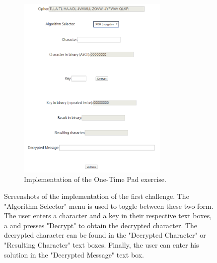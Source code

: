 \documentclass{l4proj}
\begin{document}
\begin{figure}[H]
    \begin{subfigure}[b]{0.65\textwidth}
        \centering
        \includegraphics[width=0.8\textwidth, frame]{images/xORImplementation.PNG}
        \caption{Implementation of the One-Time Pad exercise.}
        \label{fig:xORImp}
    \end{subfigure}
    \caption{Screenshots of the implementation of the first challenge.
    The "Algorithm Selector" menu is used to toggle between these two form.
    The user enters a character and a key in their respective text boxes, a
    and presses "Decrypt" to obtain the decrypted character. 
    The decrypted character can be found in the "Decrypted Character" or "Resulting Character" text boxes.
    Finally, the user can enter his solution in the "Decrypted Message" text box.}
    \label{fig:Challenge1Imp}
\end{figure}
\end{document}
